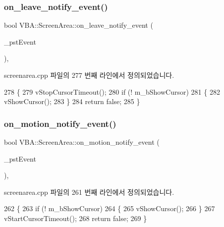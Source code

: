 \subsubsection{\texorpdfstring{on\+\_\+leave\+\_\+notify\+\_\+event()}{on\_leave\_notify\_event()}}
{\footnotesize\ttfamily bool V\+B\+A\+::\+Screen\+Area\+::on\+\_\+leave\+\_\+notify\+\_\+event (\begin{DoxyParamCaption}\item[{Gdk\+Event\+Crossing $\ast$}]{\+\_\+pst\+Event }\end{DoxyParamCaption})\hspace{0.3cm}{\ttfamily [protected]}, {\ttfamily [virtual]}}



screenarea.\+cpp 파일의 277 번째 라인에서 정의되었습니다.


\begin{DoxyCode}
278 \{
279   vStopCursorTimeout();
280   \textcolor{keywordflow}{if} (! m\_bShowCursor)
281   \{
282     vShowCursor();
283   \}
284   \textcolor{keywordflow}{return} \textcolor{keyword}{false};
285 \}
\end{DoxyCode}
\mbox{\label{class_v_b_a_1_1_screen_area_a3a341c2aa9a29f33e16923073b43e3e6}} 
\subsubsection{\texorpdfstring{on\+\_\+motion\+\_\+notify\+\_\+event()}{on\_motion\_notify\_event()}}
{\footnotesize\ttfamily bool V\+B\+A\+::\+Screen\+Area\+::on\+\_\+motion\+\_\+notify\+\_\+event (\begin{DoxyParamCaption}\item[{Gdk\+Event\+Motion $\ast$}]{\+\_\+pst\+Event }\end{DoxyParamCaption})\hspace{0.3cm}{\ttfamily [protected]}, {\ttfamily [virtual]}}



screenarea.\+cpp 파일의 261 번째 라인에서 정의되었습니다.


\begin{DoxyCode}
262 \{
263   \textcolor{keywordflow}{if} (! m\_bShowCursor)
264   \{
265     vShowCursor();
266   \}
267   vStartCursorTimeout();
268   \textcolor{keywordflow}{return} \textcolor{keyword}{false};
269 \}
\end{DoxyCode}
\mbox{\label{class_v_b_a_1_1_screen_area_aaefba8f2cfd6d3c759df0b38f9edd1bd}} 

